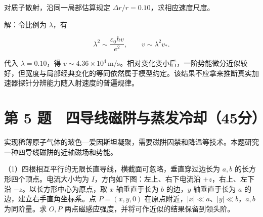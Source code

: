 \documentclass[12pt,a4paper,fontset=fandol]{ctexart}
\begin{document}
对质子散射，沿同一局部估算规定 \(\Delta r/r=0.10\)，求相应速度尺度。

解：令比例为 \(\lambda\)，有

\[\lambda^2\sim\frac{\varepsilon_0hv}{e^2},
\qquad\boxed{v\sim\lambda^2v_*}. \]

代入 \(\lambda=0.10\)，得
\(v\sim4.36\times10^4\,\mathrm{m/s}\)。相对变化变小后，一阶势能微分近似较好，但宽度与局部经典变化的等同依然属于模型约定。该结果不应拿来推断真实加速器探针分辨能力随入射速度的普遍规律。

\clearpage

\section{第 5
题　四导线磁阱与蒸发冷却（45分）}\label{ux7b2c-5-ux9898-ux56dbux5bfcux7ebfux78c1ux9631ux4e0eux84b8ux53d1ux51b7ux537445ux5206}

实现稀薄原子气体的玻色---爱因斯坦凝聚，需要磁阱囚禁和降温等技术。本题研究一种四导线磁阱的近轴磁场和势能。

（1）四根相互平行的无限长直导线，横截面可忽略，垂直穿过边长为 \(a,b\)
的长方形四个顶点。电流大小均为 \(I\)，方向如下图：左上、右下电流沿
\(+z\)，右上、左下沿 \(-z\)。以长方形中心为原点，取 \(x\) 轴垂直于长为
\(b\) 的边，\(y\) 轴垂直于长为 \(a\) 的边，建立右手直角坐标系。点
\(P=(x,y,0)\) 在原点附近，\(|x|\ll a\)、\(|y|\ll b\)，\(a,b\)
为同阶量。求 \(O,P\) 两点磁感应强度，并将可作近似的结果保留到领头阶。

\begin{center}
\begin{minipage}{\linewidth}
\centering\begingroup
{}
\ifdim\wd\diagrambox>.88\linewidth
\sbox{\diagrambox}{\resizebox{.88\linewidth}{!}{\usebox{\diagrambox}}}
\fi
\ifdim\ht\diagrambox>.40\textheight
\resizebox{!}{.40\textheight}{\usebox{\diagrambox}}
\else\usebox{\diagrambox}\fi
\par{}
\endgroup\end{minipage}
\end{center}
\end{document}
